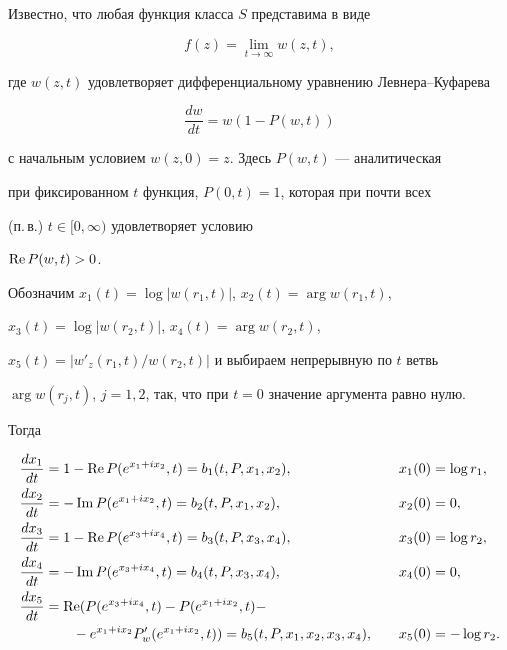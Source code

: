 Известно, что любая функция класса $S$ представима в виде


\begin{equation}


f(z)=\lim_{t\to\infty}w( z, t ),


\end{equation}


где $w(z,t)$ удовлетворяет дифференциальному уравнению Левнера--Куфарева


$$


\frac {dw}{dt}=w( 1-P(w,t) )


$$


с начальным условием $w(z,0)=z$. Здесь $P(w,t)$ --- аналитическая


при фиксированном $t$ функция, $P(0,t)=1$, которая при почти всех


(п.\,в.) $t\in[0,\infty)$ удовлетворяет условию


$\operatorname{Re} P(w,t) > 0$.





Обозначим $x_1(t)=\log|w(r_1,t)|$, $x_2(t)=\arg w(r_1,t)$,


$x_3(t)=\log|w(r_2,t)|$, $x_4(t)=\arg w(r_2,t)$,


$x_5(t)=|w'_z(r_1,t)/w(r_2,t)|$ и выбираем непрерывную по $t$ ветвь


$\arg w(r_j,t)$, $j=1,2$, так, что при $t=0$ значение аргумента равно нулю.


Тогда


\begin{alignat}{2}


\frac{dx_1}{dt}&=1- \re P(e^{x_1 + ix_2},t)=b_1(t,P,x_1,x_2),


&\quad x_1(0)&=\log r_1, \\


%


\frac{dx_2}{dt} &=-\im P(e^{x_1 + ix_2},t)=b_2 (t,P,x_1,x_2),


&\quad x_2(0)&=0, \\


%


\frac {dx_3}{dt}&=1-\re P(e^{x_3 + ix_4},t)=b_3(t,P,x_3,x_4),


&\quad x_3(0)&=\log r_2, \\


%


\frac{dx_4}{dt} &=-\im P(e^{x_3 + ix_4},t)=b_4(t,P,x_3,x_4),


&\quad x_4(0)&=0, \\


%


\frac{dx_5}{dt}&=\re (P(e^{x_3 + ix_4},t)-P(e^{x_1 + ix_2},t)- 


& \quad &\phantom{.} \notag \\


%


&\qquad -e^{x_1 + ix_2}P'_w(e^{x_1 + ix_2},t)) =


b_5(t,P,x_1,x_2,x_3,x_4),


&\quad x_5(0) &=-\log r_2.


\end{alignat}


